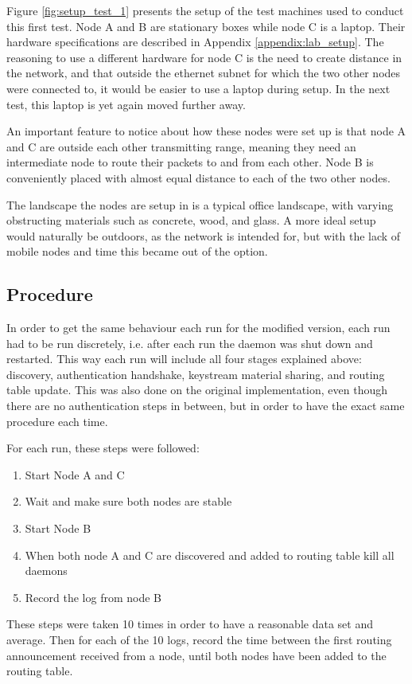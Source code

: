 Figure \ref{fig:setup_test_1} presents the setup of the test machines used to
conduct this first test. Node A and B are stationary boxes while node C is a
laptop. Their hardware specifications are described in Appendix
\ref{appendix:lab_setup}. The reasoning to use a different hardware for node C
is the need to create distance in the network, and that outside the ethernet
subnet for which the two other nodes were connected to, it would be easier to
use a laptop during setup. In the next test, this laptop is yet again moved
further away.

An important feature to notice about how these nodes were set up is that node A
and C are outside each other transmitting range, meaning they need an
intermediate node to route their packets to and from each other. Node B is
conveniently placed with almost equal distance to each of the two other nodes.

The landscape the nodes are setup in is a typical office landscape, with varying
obstructing materials such as concrete, wood, and glass. A more ideal setup
would naturally be outdoors, as the network is intended for, but with the lack
of mobile nodes and time this became out of the option.

\subsection{Procedure}
In order to get the same behaviour each run for the modified version, each run
had to be run discretely, i.e. after each run the daemon was shut down and
restarted. This way each run will include all four stages explained above:
discovery, authentication handshake, keystream material sharing, and routing
table update. This was also done on the original implementation, even though
there are no authentication steps in between, but in order to have the exact
same procedure each time.

For each run, these steps were followed:
\begin{enumerate}
  \item Start Node A and C
  \item Wait and make sure both nodes are stable
  \item Start Node B
  \item When both node A and C are discovered and added to routing table kill
  all daemons
  \item Record the log from node B
\end{enumerate}
These steps were taken 10 times in order to have a reasonable data set and
average. Then for each of the 10 logs, record the time between the first routing
announcement received from a node, until both nodes have been added to the
routing table.

